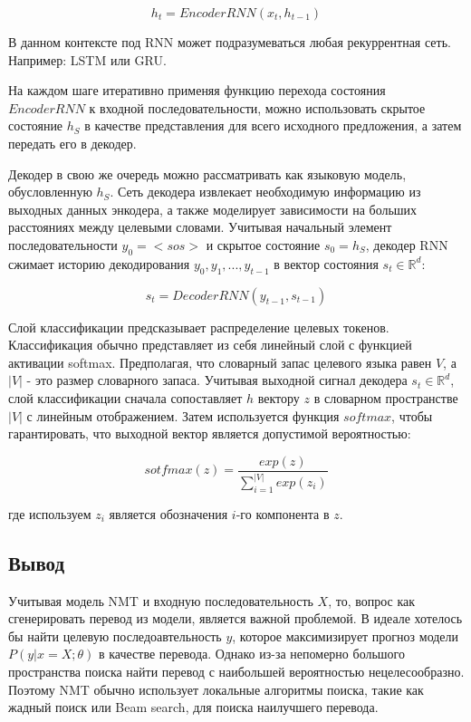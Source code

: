 	$$
	    h_t = EncoderRNN(x_t, h_{t-1})
	$$
	
	В данном контексте под RNN может подразумеваться любая рекуррентная сеть. Например: LSTM или GRU.

	На каждом шаге итеративно применяя функцию перехода состояния $EncoderRNN$ к входной последовательности, можно использовать скрытое состояние $h_S$ в качестве представления для всего исходного предложения, а затем передать его в декодер.
	
	Декодер в свою же очередь можно рассматривать как языковую модель, обусловленную $h_S$. Сеть декодера извлекает необходимую информацию из выходных данных энкодера, а также моделирует зависимости на больших расстояниях между целевыми словами. Учитывая начальный элемент последовательности $y_0 = <sos>$ и скрытое состояние $s_0=h_S$, декодер RNN сжимает историю декодирования ${y_0, y_1, ... ,y_{t−1}}$ в вектор состояния $s_t \in \mathbb{R}^d$:
	
	$$
	    s_t = DecoderRNN(y_{t-1}, s_{t-1})
	$$
	
	Слой классификации предсказывает распределение целевых токенов. Классификация обычно представляет из себя линейный слой с функцией активации softmax. Предполагая, что словарный запас целевого языка равен $V$, а $|V|$ - это размер словарного запаса. Учитывая выходной сигнал декодера $s_t \in \mathbb{R}^d$, слой классификации сначала сопоставляет $h$ вектору $z$ в словарном пространстве $|V|$ с линейным отображением. Затем используется функция $softmax$, чтобы гарантировать, что выходной вектор является допустимой вероятностью:
	
	$$
	    sotfmax(z) = \frac{exp(z)}{\sum_{i = 1}^{|V|}exp(z_i)}
	$$
	
	где используем $z_i$ является обозначения $i$-го компонента в $z$.
	
	\subsection{Вывод}
	
	Учитывая модель NMT и входную последовательность $X$, то, вопрос как сгенерировать перевод из модели, является важной проблемой. В идеале хотелось бы найти целевую последоавтельность $y$, которое максимизирует прогноз модели $P(y|x=X;\theta)$ в качестве перевода. Однако из-за непомерно большого пространства поиска найти перевод с наибольшей вероятностью нецелесообразно. Поэтому NMT обычно использует локальные алгоритмы поиска, такие как жадный поиск или Beam search, для поиска наилучшего перевода.
	
